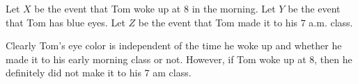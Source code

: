 Let $X$ be the event that Tom woke up at $8$ in the morning. Let $Y$ be the
event
that Tom has blue eyes. Let $Z$ be the event that Tom made it to his $7$ a.m.
class.

Clearly Tom's eye color is independent of the time he woke up and whether he
made it to his early morning class or not. However, if Tom woke up at $8$, then
he definitely did not make it to his $7$ am class.